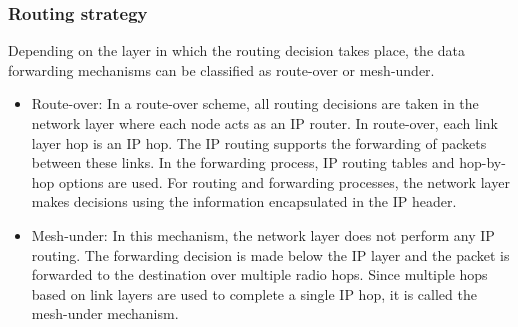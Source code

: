 \documentclass[10pt,twocolumn,twoside,submit]{JCNtran}
\begin{document}
\subsubsection{Routing strategy}
Depending on the layer in which the routing decision takes place, the data forwarding mechanisms can be classified as route-over or mesh-under. 

\begin{itemize}
\item Route-over: In a route-over scheme, all routing decisions are taken in the network layer where each node acts as an IP router. In route-over, each link layer hop is an IP hop. The IP routing supports the forwarding of packets between these links. In the forwarding process, IP routing tables and hop-by-hop options are used. For routing and forwarding processes, the network layer makes decisions using the information encapsulated in the IP header. %

\item Mesh-under: In this mechanism, the network layer does not perform any IP routing. The forwarding decision is made below the IP layer and the packet is forwarded to the destination over multiple radio hops. %
Since multiple hops based on link layers are used to complete a single IP hop, it is called the mesh-under mechanism. %
\end{itemize}
\end{document}
